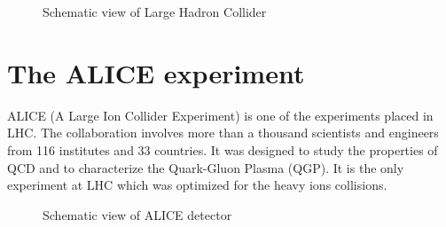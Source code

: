      \begin{figure}[!h]
		\begin{center}
        	\caption{Schematic view of Large Hadron Collider}
        	\label{lhc}
        \end{center}
    \end{figure}


\section{The ALICE experiment}

ALICE (A Large Ion Collider Experiment) is one of the experiments placed in LHC. The collaboration involves more than a thousand scientists and engineers from 116 institutes and 33 countries. It was designed to study the properties of QCD and to characterize the Quark-Gluon Plasma (QGP). It is the only experiment at LHC which was optimized for the heavy ions collisions.


     \begin{figure}[!h]
		\begin{center}
        	\caption{Schematic view of ALICE detector \cite{cds}}
        	\label{alice}
        \end{center}
    \end{figure}

